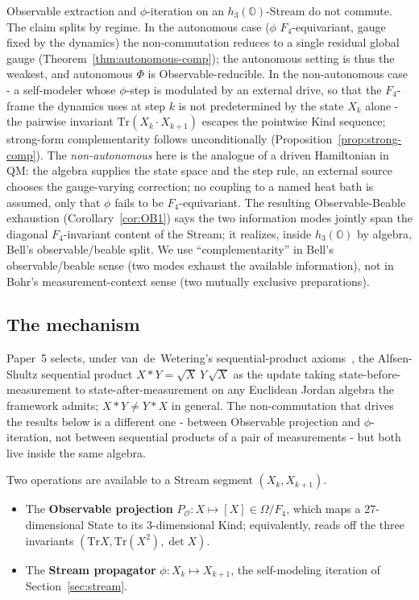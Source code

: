 \documentclass[12pt]{article}
\theoremstyle{remark}
\newcommand{\hthree}{h_3(\mathbb{O})}
\newcommand{\Ffour}{F_4}
\newcommand{\Phiexp}{\Phi}
\newcommand{\Tr}{\mathrm{Tr}}
\begin{document}
Observable extraction and $\phi$-iteration on an $\hthree$-Stream do
not commute. The claim splits by regime. In the autonomous case
($\phi$ $\Ffour$-equivariant, gauge fixed by the dynamics) the
non-commutation reduces to a single residual global gauge
(Theorem~\ref{thm:autonomous-comp}); the autonomous setting is thus
the weakest, and autonomous $\Phiexp$ is Observable-reducible. In
the non-autonomous case - a self-modeler whose $\phi$-step is
modulated by an external drive, so that the $\Ffour$-frame the
dynamics uses at step $k$ is not predetermined by the state
$X_k$ alone - the pairwise invariant $\Tr(X_k \cdot X_{k+1})$
escapes the pointwise Kind sequence; strong-form complementarity
follows unconditionally (Proposition~\ref{prop:strong-comp}). The
\emph{non-autonomous} here is the analogue of a driven Hamiltonian
in QM: the algebra supplies the state space and the step rule, an
external source chooses the gauge-varying correction; no coupling
to a named heat bath is assumed, only that $\phi$ fails to be
$\Ffour$-equivariant. The resulting Observable-Beable exhaustion
(Corollary~\ref{cor:OB1}) says the two information modes jointly
span the diagonal $\Ffour$-invariant content of the Stream; it
realizes, inside $\hthree$ by algebra, Bell's observable/beable
split. We use ``complementarity'' in Bell's
observable/beable sense (two modes exhaust the available
information), not in Bohr's measurement-context sense (two
mutually exclusive preparations).

\subsection{The mechanism}
\label{sec:complementarity-mechanism}

Paper~5 selects, under van~de~Wetering's sequential-product
axioms~\cite{vdw2019b,alfsen-shultz2001}, the Alfsen-Shultz
sequential product $X * Y = \sqrt{X}\, Y\, \sqrt{X}$ as the update
taking state-before-measurement to state-after-measurement on any
Euclidean Jordan algebra the framework admits; $X * Y \neq Y * X$ in
general. The non-commutation that drives the results below is a
different one - between Observable projection and $\phi$-iteration,
not between sequential products of a pair of measurements - but
both live inside the same algebra.

Two operations are available to a Stream segment $(X_k, X_{k+1})$.

\begin{itemize}[leftmargin=2em]
\item The \textbf{Observable projection}
$P_\mathcal{O} : X \mapsto [X] \in \Omega / \Ffour$, which maps a
27-dimensional State to its 3-dimensional Kind; equivalently, reads off
the three invariants $(\Tr X, \Tr(X^2), \det X)$.
\item The \textbf{Stream propagator} $\phi : X_k \mapsto X_{k+1}$, the
self-modeling iteration of Section~\ref{sec:stream}.
\end{itemize}
\end{document}
